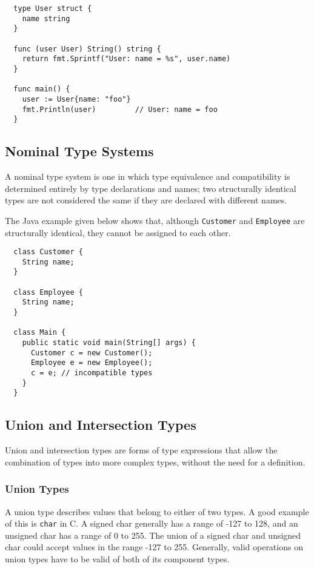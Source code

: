 \begin{verbatim}
  type User struct {
    name string
  }

  func (user User) String() string {
    return fmt.Sprintf("User: name = %s", user.name)
  }

  func main() {
    user := User{name: "foo"}
    fmt.Println(user)         // User: name = foo
  }
\end{verbatim}

\subsection{Nominal Type Systems}

A nominal type system is one in which type equivalence and compatibility is determined entirely by type declarations and names; two structurally identical types are not considered the same if they are declared with different names.

The Java example given below shows that, although \texttt{Customer} and \texttt{Employee} are structurally identical, they cannot be assigned to each other.

\begin{verbatim}
  class Customer {
    String name;
  }

  class Employee {
    String name;
  }

  class Main {
    public static void main(String[] args) {
      Customer c = new Customer(); 
      Employee e = new Employee();
      c = e; // incompatible types
    }
  }
\end{verbatim}

\subsection{Union and Intersection Types}

Union and intersection types are forms of type expressions that allow the combination of types into more complex types, without the need for a definition.

\subsubsection{Union Types}

A union type describes values that belong to either of two types. A good example of this is \texttt{char} in C. A signed char generally has a range of -127 to 128, and an unsigned char has a range of 0 to 255. The union of a signed char and unsigned char could accept values in the range -127 to 255. Generally, valid operations on union types have to be valid of both of its component types.

